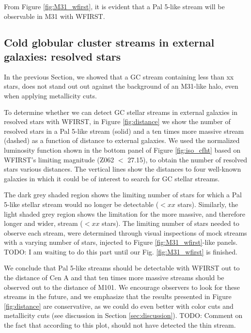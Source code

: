 \documentclass[twocolumn]{aastex62}
\newcommand{\todo}[1]{{\color{red} TODO: #1}}
\begin{document}
From Figure \ref{fig:M31_wfirst}, it is evident that a Pal 5-like stream will be observable in M31 with WFIRST. 



\subsection{Cold globular cluster streams in external galaxies: resolved stars}
\label{sec:resother}
In the previous Section, we showed that a GC stream containing less than xx stars, does not stand out out against the background of an M31-like halo, even when applying metallicity cuts. 

To determine whether we can detect GC stellar streams in external galaxies in resolved stars with WFIRST, in Figure \ref{fig:distance} we show the number of resolved stars in a Pal 5-like stream (solid) and a ten times more massive stream (dashed) as a function of distance to external galaxies. We used the normalized luminosity function shown in the bottom panel of Figure \ref{fig:iso_cfht} based on WFIRST's limiting magnitude (Z062 $<$ 27.15), to obtain the number of resolved stars various distances. The vertical lines show the distances to four well-known galaxies in which it could be of interest to search for GC stellar streams. 

The dark grey shaded region shows the limiting number of stars for which a Pal 5-like stellar stream would no longer be detectable ($<xx$ stars). Similarly, the light shaded grey region shows the limitation for the more massive, and therefore longer and wider, stream ($<xx$ stars). The limiting number of stars needed to observe each stream, were determined through visual inspections of mock streams with a varying number of stars, injected to Figure \ref{fig:M31_wfirst}-like panels. \todo{I am waiting to do this part until our Fig. \ref{fig:M31_wfirst} is finished.}

We conclude that Pal 5-like streams should be detectable with WFIRST out to the distance of Cen A and that ten times more massive streams should be observed out to the distance of M101. We encourage observers to look for these streams in the future, and we emphasize that the results presented in Figure \ref{fig:distance} are conservative, as we could do even better with color cuts and metallicity cuts (see discussion in Section \ref{sec:discussion}). \todo{Comment on the fact that according to this plot, \citet{abraham18} should not have detected the thin stream}. 
\end{document}
